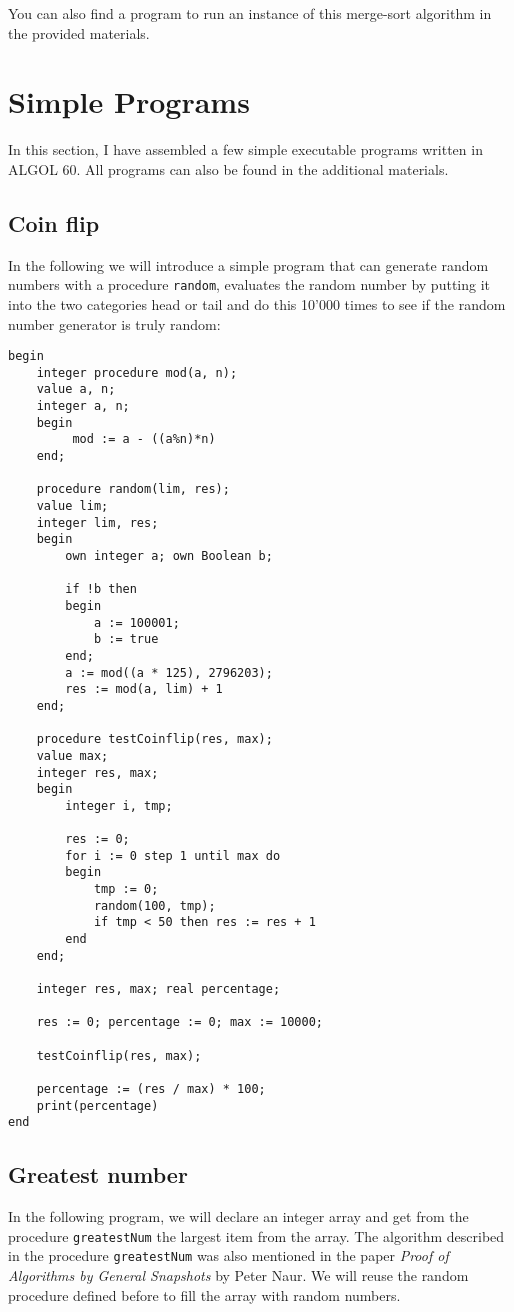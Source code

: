 \documentclass{article}
\begin{document}
You can also find a program to run an instance of this merge-sort algorithm in the provided materials.

\newpage

\section{Simple Programs} \label{simpleProg}
In this section, I have assembled a few simple executable programs written in ALGOL 60. All programs can also be found in the additional materials.

\subsection{Coin flip}
In the following we will introduce a simple program that can generate random numbers with a procedure \texttt{random}, evaluates the random number by putting it into the two categories head or tail and do this 10'000 times to see if the random number generator is truly random:

\begin{lstlisting}[language={[60]algol}]
begin
    integer procedure mod(a, n);
    value a, n;
    integer a, n;
    begin
         mod := a - ((a%n)*n)
    end;
 
    procedure random(lim, res);
    value lim;
    integer lim, res;
    begin
        own integer a; own Boolean b;
        
        if !b then
        begin
            a := 100001;
            b := true
        end;
        a := mod((a * 125), 2796203);
        res := mod(a, lim) + 1
    end;
    
    procedure testCoinflip(res, max);
    value max;
    integer res, max;
    begin
        integer i, tmp;
        
        res := 0; 
        for i := 0 step 1 until max do
        begin
            tmp := 0;
            random(100, tmp);
            if tmp < 50 then res := res + 1
        end
    end;
    
    integer res, max; real percentage;
    
    res := 0; percentage := 0; max := 10000;
    
    testCoinflip(res, max);
    
    percentage := (res / max) * 100;
    print(percentage)
end    
\end{lstlisting}

\subsection{Greatest number}
In the following program, we will declare an integer array and get from the procedure \texttt{greatestNum} the largest item from the array. The algorithm described in the procedure \texttt{greatestNum} was also mentioned in the paper \textit{Proof of Algorithms by General Snapshots} by Peter Naur. We will reuse the random procedure defined before to fill the array with random numbers.
\end{document}

